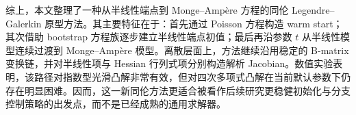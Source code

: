 \documentclass[11pt,a4paper]{article}
\begin{document}
综上，本文整理了一种从半线性端点到 Monge--Amp\`ere 方程的同伦 Legendre--Galerkin 原型方法。其主要特征在于：首先通过 Poisson 方程构造 warm start；其次借助 bootstrap 方程族逐步建立半线性端点初值；最后再沿参数 $t$ 从半线性模型连续过渡到 Monge--Amp\`ere 模型。离散层面上，方法继续沿用稳定的 B-matrix 变换链，并对半线性项与 Hessian 行列式项分别构造解析 Jacobian。数值实验表明，该路径对指数型光滑凸解非常有效，但对四次多项式凸解在当前默认参数下仍存在明显困难。因而，这一新同伦方法更适合被看作后续研究更稳健初始化与分支控制策略的出发点，而不是已经成熟的通用求解器。
\end{document}
